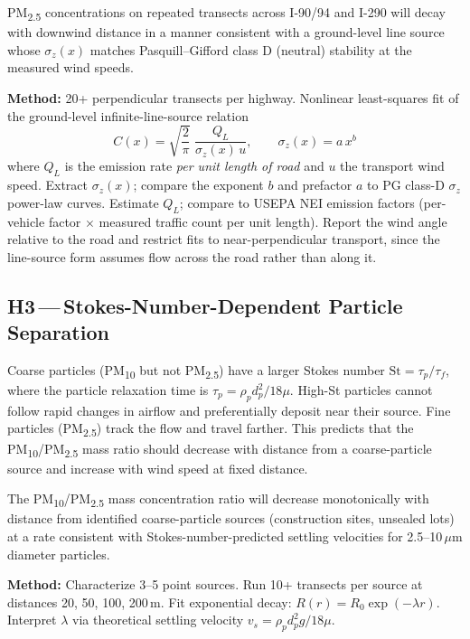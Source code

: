 \documentclass[11pt, letterpaper]{article}
\begin{document}
\begin{tcolorbox}[callout, title={Testable Hypothesis}]
PM\textsubscript{2.5} concentrations on repeated transects across I-90/94 and I-290 will
decay with downwind distance in a manner consistent with a ground-level line source whose
$\sigma_z(x)$ matches Pasquill--Gifford class D (neutral)
stability at the measured wind speeds.

\medskip
\textbf{Method:} 20+ perpendicular transects per highway. Nonlinear least-squares fit of
the ground-level infinite-line-source relation
\[
  C(x) = \sqrt{\frac{2}{\pi}}\;\frac{Q_L}{\sigma_z(x)\,u},
  \qquad \sigma_z(x) = a\,x^{b}
\]
where $Q_L$ is the emission rate \emph{per unit length of road} and $u$ the
transport wind speed. Extract $\sigma_z(x)$; compare the exponent $b$ and prefactor $a$
to PG class-D $\sigma_z$ power-law curves. Estimate $Q_L$; compare to USEPA NEI emission
factors (per-vehicle factor $\times$ measured traffic count per unit length).
Report the wind angle relative to the road and restrict fits to near-perpendicular
transport, since the line-source form assumes flow across the road rather than along it.
\end{tcolorbox}

\subsection{H3\,---\,Stokes-Number-Dependent Particle Separation}

Coarse particles (PM\textsubscript{10} but not PM\textsubscript{2.5}) have a larger Stokes number
$\mathrm{St} = \tau_p / \tau_f$, where the particle relaxation time is
$\tau_p = \rho_p d_p^2 / 18\mu$. High-St particles cannot follow rapid changes in airflow and
preferentially deposit near their source. Fine particles (PM\textsubscript{2.5}) track the flow
and travel farther. This predicts that the PM\textsubscript{10}/PM\textsubscript{2.5} mass ratio
should decrease with distance from a coarse-particle source and increase with wind speed at fixed
distance.

\begin{tcolorbox}[callout, title={Testable Hypothesis}]
The PM\textsubscript{10}/PM\textsubscript{2.5} mass concentration ratio will decrease
monotonically with distance from identified coarse-particle sources (construction sites, unsealed
lots) at a rate consistent with Stokes-number-predicted settling velocities for 2.5--10\,$\mu$m
diameter particles.

\medskip
\textbf{Method:} Characterize 3--5 point sources. Run 10+ transects per source at distances
20, 50, 100, 200\,m. Fit exponential decay: $R(r) = R_0 \exp(-\lambda r)$. Interpret $\lambda$ via
theoretical settling velocity $v_s = \rho_p d_p^2 g / 18\mu$.
\end{tcolorbox}
\end{document}
